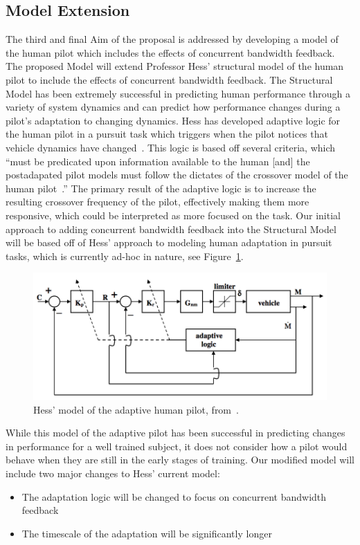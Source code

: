 \subsection{Model Extension}
The third and final Aim of the proposal is addressed by developing a model of the human pilot which includes the effects of concurrent bandwidth feedback.
The proposed Model will extend Professor Hess' structural model of the human pilot to include the effects of concurrent bandwidth feedback.
The Structural Model has been extremely successful in predicting human performance through a variety of system dynamics and can predict how performance changes during a pilot's adaptation to changing dynamics.
Hess has developed adaptive logic for the human pilot in a pursuit task which triggers when the pilot notices that vehicle dynamics have changed~\citep{hess_modeling_2009}.
This logic is based off several criteria, which ``must be predicated upon information available to the human [and] the postadapated pilot models must follow the dictates of the crossover model of the human pilot~\citep{hess_modeling_2009}.''
The primary result of the adaptive logic is to increase the resulting crossover frequency of the pilot, effectively making them more responsive, which could be interpreted as more focused on the task.
Our initial approach to adding concurrent bandwidth feedback into the Structural Model will be based off of Hess' approach to modeling human adaptation in pursuit tasks, which is currently ad-hoc in nature, see Figure~\ref{figure:hesspursuit}.

\begin{figure}[tb]
    \begin{center}
        \includegraphics[width=0.8\linewidth]{figures/Screen_Shot_2018-08-09_at_4_15_24_PM.png}
        \caption{Hess' model of the adaptive human pilot, from~\citep{hess_modeling_2009}.}
        \label{figure:hesspursuit}
    \end{center}
\end{figure}

While this model of the adaptive pilot has been successful in predicting changes in performance for a well trained subject, it does not consider how a pilot would behave when they are still in the early stages of training.
Our modified model will include two major changes to Hess' current model:
\begin{itemize}
\item The adaptation logic will be changed to focus on concurrent bandwidth feedback
\item The timescale of the adaptation will be significantly longer
\end{itemize}

